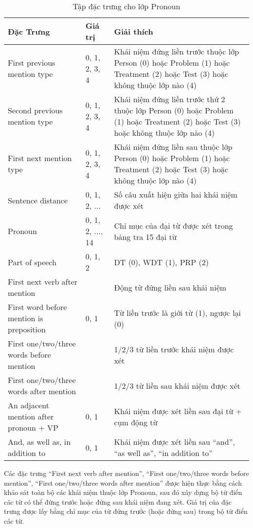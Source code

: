 \begin{table}[th]
\centering{}
\caption{Tập đặc trưng cho lớp Pronoun \label{tab:PronounFeatures}}
\footnotesize\sffamily

\begin{tabularx}{\textwidth}{@{}P{\raggedright}{0.3}lL@{}}
\toprule 
\textbf{Đặc Trưng} & \textbf{Giá trị} & \textbf{Giải thích}\\
\midrule
First previous mention type & 0, 1, 2, 3, 4 & Khái niệm đứng liền trước thuộc lớp Person (0) hoặc Problem (1) hoặc Treatment (2) hoặc Test (3) hoặc không thuộc lớp nào (4)\\
Second previous mention type & 0, 1, 2, 3, 4 & Khái niệm đứng liền trước thứ 2 thuộc lớp Person (0) hoặc Problem (1) hoặc Treatment (2) hoặc Test (3) hoặc không thuộc lớp nào (4)\\
First next mention type & 0, 1, 2, 3, 4 & Khái niệm đứng liền sau thuộc lớp Person (0) hoặc Problem (1) hoặc Treatment (2) hoặc Test (3) hoặc không thuộc lớp nào (4)\\
Sentence distance & 0, 1, 2, ... & Số câu xuất hiện giữa hai khái niệm được xét\\
Pronoun & 0, 1, 2, ..., 14 & Chỉ mục của đại từ được xét trong bảng tra 15 đại từ\\
Part of speech & 0, 1, 2 & DT (0), WDT (1), PRP (2)\\
First next verb after mention & & Động từ đứng liền sau khái niệm\\
First word before mention is preposition & 0, 1 & Từ liền trước là giới từ (1), ngược lại (0)\\
First one/two/three words before mention & & 1/2/3 từ liền trước khái niệm được xét\\
First one/two/three words after mention & & 1/2/3 từ liền sau khái niệm được xét\\
An adjacent mention after pronoun + VP  & 0, 1 & Khái niệm được xét liền sau đại từ + cụm động từ\\
And, as well as, in addition to & 0, 1 & Khái niệm được xét liền sau ``and'', ``as well as'', ``in addition to''\\
\bottomrule
\end{tabularx}
\end{table}

Các đặc trưng ``First next verb after mention'', ``First one/two/three words before mention'', ``First one/two/three words after mention'' được hiện thực bằng cách khảo sát toàn bộ các khái niệm thuộc lớp Pronoun, sau đó xây dựng bộ từ điển các từ có thể đứng trước hoặc đứng sau khái niệm đang xét. Giá trị của đặc trưng được lấy bằng chỉ mục của từ đứng trước (hoặc đứng sau) trong bộ từ điển các từ.

